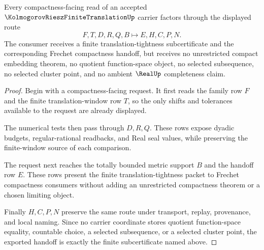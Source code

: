 \begin{theorem}
\label{thm:kolmogorov-riesz-frechet-compactness-handoff}
Every compactness-facing read of an accepted $\KolmogorovRieszFiniteTranslationUp$ carrier factors through the displayed route
$$
F,T,D,R,Q,B \longmapsto E,H,C,P,N .
$$
The consumer receives a finite translation-tightness subcertificate and the corresponding Frechet compactness handoff, but receives no unrestricted compact embedding theorem, no quotient function-space object, no selected subsequence, no selected cluster point, and no ambient $\RealUp$ completeness claim.
\end{theorem}
\begin{proof}
Begin with a compactness-facing request. It first reads the family row $F$ and the finite translation-window row $T$, so the only shifts and tolerances available to the request are already displayed.

The numerical tests then pass through $D,R,Q$. These rows expose dyadic budgets, regular-rational readbacks, and Real seal values, while preserving the finite-window source of each comparison.

The request next reaches the totally bounded metric support $B$ and the handoff row $E$. These rows present the finite translation-tightness packet to Frechet compactness consumers without adding an unrestricted compactness theorem or a chosen limiting object.

Finally $H,C,P,N$ preserve the same route under transport, replay, provenance, and local naming. Since no carrier coordinate stores quotient function-space equality, countable choice, a selected subsequence, or a selected cluster point, the exported handoff is exactly the finite subcertificate named above.
\end{proof}


